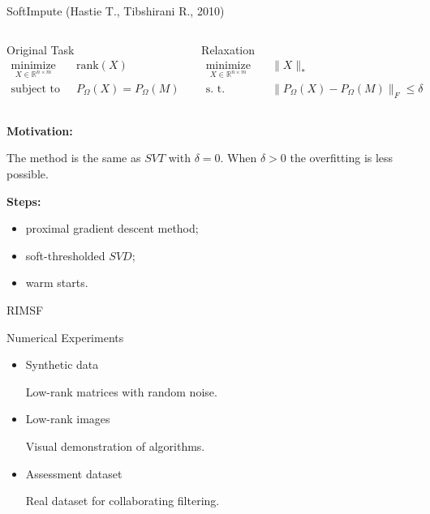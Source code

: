 \documentclass{beamer}
\begin{document}
\begin{frame}{SoftImpute (Hastie T., Tibshirani R., 2010)}
	\begin{columns}[c]
		\begin{block}{Original Task}
			\vspace{-0.5cm}
			\begin{align*}
			\mathop{\text{minimize}}\limits_{X \in \mathbb{R}^{n \times m}} \quad & 
			\text{rank} (X) \\
			\text{subject to} \quad & P_{\Omega} (X) = P_{\Omega} (M)
			\end{align*}
		\end{block}
		
		\begin{block}{Relaxation}
			\vspace{-0.5cm}
			\begin{align*}
			\mathop{\text{minimize}}\limits_{X \in \mathbb{R}^{n \times m}} \quad & 
			\| X \|_* \\
			\text{s. t.} \quad & \| P_{\Omega} (X) - P_{\Omega} (M) \|_F \leq \delta
			\end{align*}
		\end{block}
	\end{columns}
\vspace{0.3cm}
\textbf{Motivation:}
	
	The method is the same as $SVT$ with $\delta = 0$. When $\delta>0$ the overfitting is less possible.
	
\vspace{0.3cm}
\textbf{Steps:}
\begin{itemize}
	\item proximal gradient descent method;
	\item soft-thresholded $SVD$;
	\item warm starts.
\end{itemize}

\end{frame}
\begin{frame}{RIMSF}
	
\end{frame}
\begin{frame}{Numerical Experiments}
\begin{itemize}
	\item Synthetic data
	
	Low-rank matrices with random noise.
	\item Low-rank images
	
	Visual demonstration of algorithms.
	\item Assessment dataset
	
	Real dataset for collaborating filtering.
\end{itemize}

\end{frame}
\end{document}
